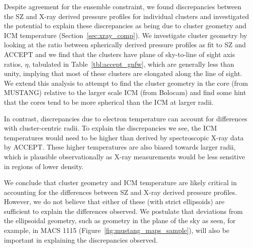 \documentclass[iop,numberedappendix,apj]{emulateapj}
\begin{document}
Despite agreement for the ensemble constraint, we found discrepancies between the SZ and X-ray derived
pressure profiles for individual clusters and investigated the potential to explain these discrepancies
as being due to cluster geometry and ICM temperature (Section~\ref{sec:xray_comp}). We investigate cluster
geometry by looking at the ratio between spherically derived pressure profiles as fit to SZ and ACCEPT and
we find that the clusters have plane of sky-to-line of sight axis ratios, $\eta$, tabulated in 
Table~\ref{tbl:accept_gnfw}, which are generally less than unity, implying that most of these clusters are 
elongated along the line of sight. We extend this analysis to attempt to find the cluster geometry
in the core (from MUSTANG) relative to the larger scale ICM (from Bolocam) and find some 
hint that the cores tend to be more spherical than the ICM at larger radii. 

In contrast, discrepancies due to electron temperature can account for differences with cluster-centric radii.
To explain the discrepancies we see, the ICM temperatures would need to be higher than derived by 
spectroscopic X-ray data by ACCEPT. These higher temperatures are also biased towards larger radii, which is 
plausible observationally as X-ray measurements would be less sensitive in regions of lower density.

We conclude that cluster geometry and ICM temperature are likely critical in accounting for the differences
between SZ and X-ray derived pressure profiles. However, we do not believe that either of these (with
strict ellipsoids) are sufficient to explain the differences observed. We postulate that deviations from
the ellipsoidal geometry, such as geometry in the plane of the sky as seen, for example, in MACS 1115
(Figure~\ref{fig:mustang_maps_sample}), will also be important in explaining the discrepancies observed.

\end{document}
